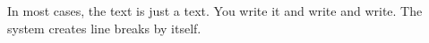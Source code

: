 \documentclass{article}
\begin{document}
\vspace*{\fill} \vspace*{-5ex}

In most cases, the text is just a text. You write it and write and write. The system creates line breaks by itself.

\vspace*{\fill}
\end{document}
